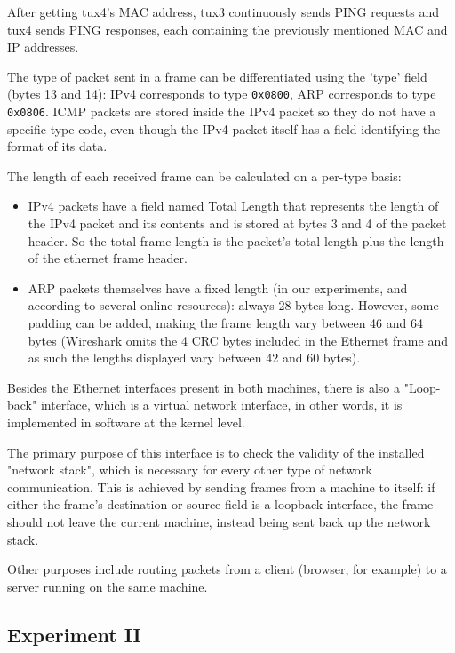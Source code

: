 After getting tux4's MAC address, tux3 continuously sends PING requests and tux4 sends PING responses, each containing the previously mentioned MAC and IP addresses.

The type of packet sent in a frame can be differentiated using the 'type' field (bytes 13 and 14): IPv4 corresponds to type \lstinline{0x0800}, ARP corresponds to type \lstinline{0x0806}. ICMP packets are stored inside the IPv4 packet so they do not have a specific type code, even though the IPv4 packet itself has a field identifying the format of its data.

The length of each received frame can be calculated on a per-type basis:

\begin{itemize}
    \item IPv4 packets have a field named Total Length that represents the length of the IPv4 packet and its contents and is stored at bytes 3 and 4 of the packet header. So the total frame length is the packet's total length plus the length of the ethernet frame header.
    \item ARP packets themselves have a fixed length (in our experiments, and according to several online resources): always 28 bytes long. However, some padding can be added, making the frame length vary between 46 and 64 bytes (Wireshark omits the 4 CRC bytes included in the Ethernet frame and as such the lengths displayed vary between 42 and 60 bytes).
\end{itemize}

Besides the Ethernet interfaces present in both machines, there is also a "Loop-back" interface, which is a virtual network interface, in other words, it is implemented in software at the kernel level.

The primary purpose of this interface is to check the validity of the installed "network stack", which is necessary for every other type of network communication.
This is achieved by sending frames from a machine to itself: if either the frame's destination or source field is a loopback interface, the frame should not leave the current machine, instead being sent back up the network stack.

Other purposes include routing packets from a client (browser, for example) to a server running on the same machine.

\subsection{Experiment II}

